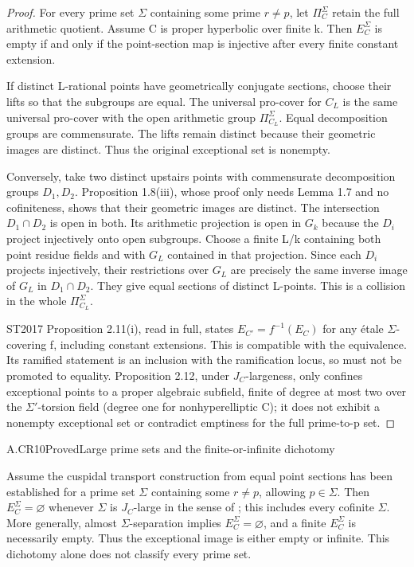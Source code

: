\begin{proof}

For every prime set \({\Sigma}\) containing some prime \(r\ne p\), let \({\Pi}_C^{\Sigma}\) retain the full arithmetic quotient. Assume C is proper hyperbolic over finite k. Then \(E_C^{\Sigma}\) is empty if and only if the point-section map is injective after every finite constant extension.

If distinct L-rational points have geometrically conjugate sections, choose their lifts so that the subgroups are equal. The universal pro-cover for \(C_L\) is the same universal pro-cover with the open arithmetic group \({\Pi}_{C_L}^{\Sigma}\). Equal decomposition groups are commensurate. The lifts remain distinct because their geometric images are distinct. Thus the original exceptional set is nonempty.

Conversely, take two distinct upstairs points with commensurate decomposition groups \(D_1,D_2\). Proposition 1.8(iii), whose proof only needs Lemma 1.7 and no cofiniteness, shows that their geometric images are distinct. The intersection \(D_1{\cap}D_2\) is open in both. Its arithmetic projection is open in \(G_k\) because the \(D_i\) project injectively onto open subgroups. Choose a finite L/k containing both point residue fields and with \(G_L\) contained in that projection. Since each \(D_i\) projects injectively, their restrictions over \(G_L\) are precisely the same inverse image of \(G_L\) in \(D_1{\cap}D_2\). They give equal sections of distinct L-points. This is a collision in the whole \({\Pi}_{C_L}^{\Sigma}\).

ST2017 Proposition 2.11(i), read in full, states \(E_{C'}=f^{-1}(E_C)\) for any étale \({\Sigma}\)-covering f, including constant extensions. This is compatible with the equivalence. Its ramified statement is an inclusion with the ramification locus, so must not be promoted to equality. Proposition 2.12, under \(J_C\)-largeness, only confines exceptional points to a proper algebraic subfield, finite of degree at most two over the \({\Sigma}'\)-torsion field (degree one for nonhyperelliptic C); it does not exhibit a nonempty exceptional set or contradict emptiness for the full prime-to-p set.


\end{proof}

\begin{claim}{A.CR10}{Proved}{Large prime sets and the finite-or-infinite dichotomy}

Assume the cuspidal transport construction from equal point sections
has been established for a prime set $\Sigma$ containing some
$r\ne p$, allowing $p\in\Sigma$. Then
$E_C^\Sigma=\varnothing$ whenever $\Sigma$ is $J_C$-large in the
sense of \cite{ST2017}; this includes every cofinite $\Sigma$.
More generally, almost $\Sigma$-separation implies
$E_C^\Sigma=\varnothing$, and a finite $E_C^\Sigma$ is necessarily
empty. Thus the exceptional image is either empty or infinite.
This dichotomy alone does not classify every prime set.

\end{claim}

